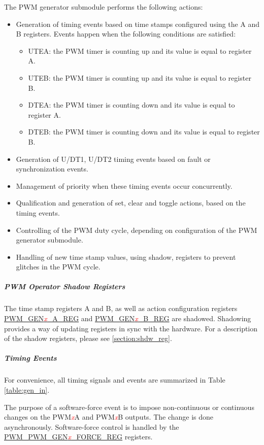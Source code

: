 \documentclass[main\_\_EN.tex]{subfiles}
\begin{document}
The PWM generator submodule performs the following actions:
\begin{itemize}
    \item Generation of timing events based on time stamps configured using the A and B registers. Events happen when the following conditions are satisfied:
    \begin{itemize}
        \item UTEA: the PWM timer is counting up and its value is equal to register A.
        \item UTEB: the PWM timer is counting up and its value is equal to register B.
        \item DTEA: the PWM timer is counting down and its value is equal to register A.
        \item DTEB: the PWM timer is counting down and its value is equal to register B.
    \end{itemize}
    \item Generation of U/DT1, U/DT2 timing events based on fault or synchronization events.
    \item Management of priority when these timing events occur concurrently.
    \item Qualification and generation of set, clear and toggle actions, based on the timing events.
    \item Controlling of the PWM duty cycle, depending on configuration of the PWM generator submodule.
    \item Handling of new time stamp values, using shadow, registers to prevent glitches in the PWM cycle.
\end{itemize}

\subparagraph{PWM Operator Shadow Registers}
The time stamp registers A and B, as well as action configuration registers  \hyperref[regdesc:PWMGEN0AREG]{PWM\_GEN\textcolor{red}{\it{x}}\_A\_REG} and \hyperref[regdesc:PWMGEN0BREG]{PWM\_GEN\textcolor{red}{\it{x}}\_B\_REG} are shadowed. Shadowing provides a way of updating registers in sync with the hardware. For a description of the shadow registers, please see \ref{section:shdw_reg}.

\subparagraph{Timing Events}
For convenience, all timing signals and events are summarized in Table \ref{table:gen_in}.


The purpose of a software-force event is to impose non-continuous or continuous changes on the PWM\textcolor{red}{\it{x}}A and PWM\textcolor{red}{\it{x}}B outputs. The change is done asynchronously. Software-force control is handled by the\\ \hyperref[regdesc:PWMGEN0FORCEREG]{PWM\_PWM\_GEN\textcolor{red}{\it{x}}\_FORCE\_REG} registers.
\end{document}
